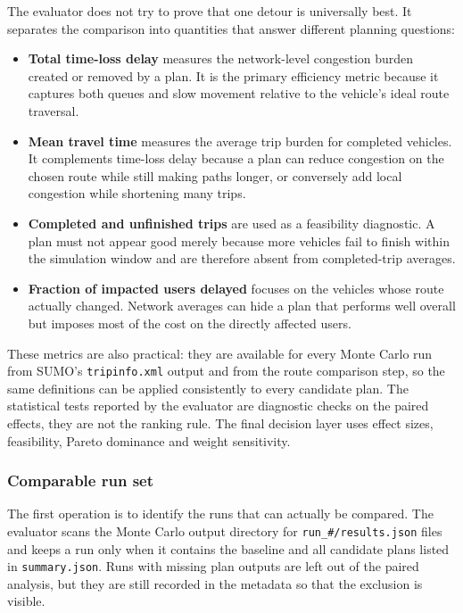 The evaluator does not try to prove that one detour is universally best. It
separates the comparison into quantities that answer different planning
questions:
\begin{itemize}
  \item \textbf{Total time-loss delay} measures the network-level congestion
        burden created or removed by a plan. It is the primary efficiency
        metric because it captures both queues and slow movement relative to
        the vehicle's ideal route traversal.
  \item \textbf{Mean travel time} measures the average trip burden for
        completed vehicles. It complements time-loss delay because a plan can
        reduce congestion on the chosen route while still making paths longer,
        or conversely add local congestion while shortening many trips.
  \item \textbf{Completed and unfinished trips} are used as a feasibility
        diagnostic. A plan must not appear good merely because more vehicles
        fail to finish within the simulation window and are therefore absent
        from completed-trip averages.
  \item \textbf{Fraction of impacted users delayed} focuses on the vehicles
        whose route actually changed. Network averages can hide a plan that
        performs well overall but imposes most of the cost on the directly
        affected users.
\end{itemize}

These metrics are also practical: they are available for every Monte Carlo run
from SUMO's \texttt{tripinfo.xml} output and from the route comparison step, so
the same definitions can be applied consistently to every candidate plan. The
statistical tests reported by the evaluator are diagnostic checks on the
paired effects, they are not the ranking rule. The final decision layer uses
effect sizes, feasibility, Pareto dominance and weight sensitivity.

\subsubsection{Comparable run set}
\label{sssec:evaluator_comparable_runs}

The first operation is to identify the runs that can actually be compared.
The evaluator scans the Monte Carlo output directory for
\texttt{run\_\#/results.json} files and keeps a run only when it contains the
baseline and all candidate plans listed in \texttt{summary.json}. Runs with
missing plan outputs are left out of the paired analysis, but they are still
recorded in the metadata so that the exclusion is visible.

